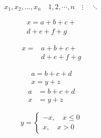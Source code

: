 \documentclass{article}
\begin{document}
\[ x_1,x_2,\dots ,x_n\quad 1,2,\cdots ,n\quad
	\vdots\quad \ddots \]

\begin{multline}
	x = a+b+c+{} \\
	d+e+f+g
\end{multline}


\[\begin{aligned}
		x ={} & a+b+c+{} \\
		      & d+e+f+g
	\end{aligned}\]

\begin{gather}
	a = b+c+d \\
	x = y+z
\end{gather}
\begin{align}
	a & = b+c+d \\
	x & = y+z
\end{align}

\[ y= \begin{cases}
		-x,\quad x\leq 0 \\
		x,\quad x>0
    \end{cases} \]
    
    
\end{document}
